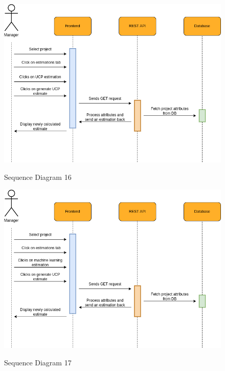 \begin{figure}[H]
    \centering
    \caption{Sequence Diagram 16}
    \includegraphics[scale=0.5]{./diagrams/sequence/seq-16.png}
    \label{fig:seq-16}
    
\end{figure}


\begin{figure}[H]
    \centering
    \caption{Sequence Diagram 17}
    \includegraphics[scale=0.5]{./diagrams/sequence/seq-17.png}
    \label{fig:seq-17}
    
\end{figure}


